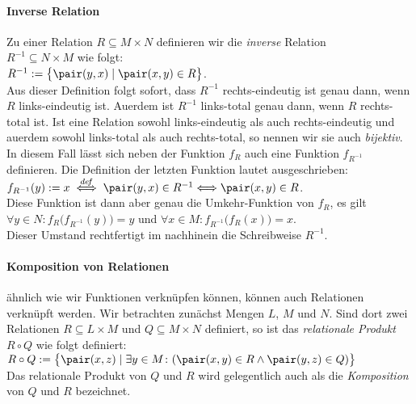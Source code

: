 \paragraph{Inverse Relation}
Zu einer  Relation $R \subseteq M \times N$ definieren wir die \emph{inverse} Relation \\
$R^{-1} \subseteq N \times M$ wie folgt: \\[0.2cm]
\hspace*{1.3cm} $R^{-1} := \bigl\{ \pair(y,x) \mid \pair(x,y) \in R  \bigr\}$. \\[0.2cm]
Aus dieser Definition folgt sofort, dass $R^{-1}$ rechts-eindeutig ist genau dann, wenn
$R$ links-eindeutig ist.  Au\3erdem ist $R^{-1}$ links-total genau dann, wenn $R$
rechts-total ist.  Ist eine Relation sowohl links-eindeutig als auch rechts-eindeutig und
au\3erdem sowohl links-total als auch rechts-total, so nennen wir sie auch \emph{bijektiv}.
In diesem Fall l\"{a}sst sich neben der Funktion
$f_R$ auch eine Funktion $f_{R^{-1}}$ definieren.  Die Definition der letzten Funktion
lautet ausgeschrieben: \\[0.2cm]
\hspace*{1.3cm} $f_{R^{-1}}(y) := x \;\stackrel{de\!f}{\Longleftrightarrow}\; \pair(y,x) \in R^{-1} \Longleftrightarrow \pair(x,y) \in R$. \\[0.2cm]
Diese Funktion ist dann aber genau die Umkehr-Funktion von $f_R$, es gilt \\[0.2cm]
\hspace*{1.3cm}
 $\forall y \in N \colon f_R\bigl(f_{R^{-1}}(y)\bigr) = y$ \quad und \quad
 $\forall x \in M \colon f_{R^{-1}}\bigl(f_R(x)\bigr) = x$. \\[0.2cm]
Dieser Umstand rechtfertigt im nachhinein die Schreibweise $R^{-1}$.

\paragraph{Komposition von Relationen}
\"{a}hnlich wie wir Funktionen verkn\"{u}pfen k\"{o}nnen, k\"{o}nnen auch Relationen verkn\"{u}pft werden.
Wir betrachten zun\"{a}chst Mengen $L$, $M$ und $N$.
Sind dort zwei Relationen $R \subseteq L \times M$ und $Q \subseteq M \times N$ definiert,
so ist das \emph{relationale Produkt} $R \circ Q$ wie folgt definiert: \\[0.2cm]
\hspace*{1.3cm}
$R \circ Q := \bigl\{ \pair(x,z) \mid \exists y \in M \colon(\pair(x,y) \in R \wedge \pair(y,z) \in Q) \bigr\}$ 
\\[0.2cm]
Das relationale Produkt von $Q$ und $R$ wird gelegentlich auch als die \emph{Komposition} von
$Q$ und $R$ bezeichnet.  


